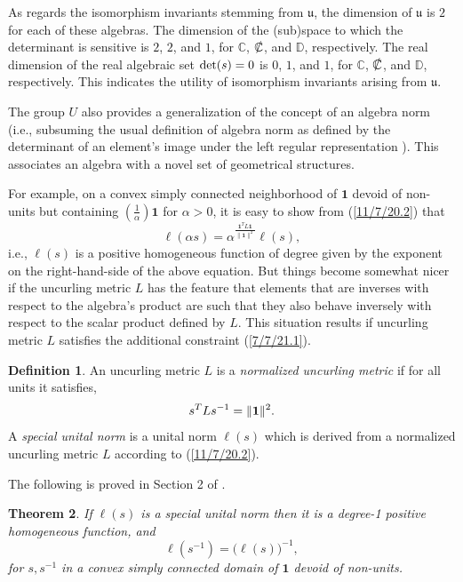 \documentclass{amsart}
\numberwithin{equation}{section}
\newtheorem{theorem}{Theorem}
\theoremstyle{definition}
\newtheorem{definition}[theorem]{Definition}
\numberwithin{theorem}{section}
\begin{document}
  As regards the isomorphism invariants stemming from $\mathfrak{u}$, the dimension of $\mathfrak{u}$ is $2$ for each of these algebras.  The dimension of the (sub)space to which the determinant is sensitive is $2$, $2$, and $1$, for $\mathbb{C}$, $\slashed{\mathbb{C}}$, and $\mathbb{D}$, respectively.  The real dimension of the real algebraic set ${\rm det}(s) = 0$ is $0$, $1$, and $1$, for $\mathbb{C}$, $\slashed{\mathbb{C}}$, and $\mathbb{D}$, respectively.  This indicates the utility of isomorphism invariants arising from $\mathfrak{u}$. 

The group $U$ also provides a generalization of the concept of an algebra norm (i.e., subsuming the usual definition of algebra norm as defined by the determinant of an element's image under the left regular representation \cite{bourbaki:1989}).  This associates an algebra with a novel set of geometrical structures.


For example, on a convex simply connected neighborhood of $\mathbf{1}$ devoid of non-units but containing $\left(\frac{1}{\alpha}\right)\mathbf{1}$ for $\alpha>0$, it is easy to show from (\ref{11/7/20.2}) that \[  \ell(\alpha s) = \alpha^{\frac{\mathbf{1}^T L \mathbf{1}}{\|\mathbf{1}\|^2}} \ell(s),\] i.e., $ \ell(s)$ is a positive homogeneous function of degree given by the exponent on the right-hand-side of the above equation.  
 But things become somewhat nicer if the uncurling metric $L$ has the feature that elements that are inverses with respect to the algebra's product are such that they also behave inversely with respect to the scalar product defined by $L$.  This situation results if uncurling metric $L$ satisfies the additional constraint (\ref{7/7/21.1}).
 
\begin{definition} An uncurling metric $L$ is a {\it normalized uncurling metric} if for all units it satisfies, \begin{equation} \label{7/7/21.1} s^TLs^{-1} =\|{\bf 1}\|^2.\end{equation}  A {\it special unital norm} is a unital norm $ \ell(s)$ which is derived from a normalized uncurling metric $L$ according to (\ref{11/7/20.2}). 
\end{definition}

The following is proved in Section 2 of \cite{fgreensite:2023}.
\begin{theorem} If $ \ell(s)$ is a special unital norm then it is a degree-1 positive homogeneous function, and
\begin{equation}\label{5/23/23.3}  \ell(s^{-1}) = \big( \ell(s)\big)^{-1}, \end{equation} for $s,s^{-1}$ in a convex simply connected domain of $\mathbf{1}$ devoid of non-units. \end{theorem}
\end{document}
